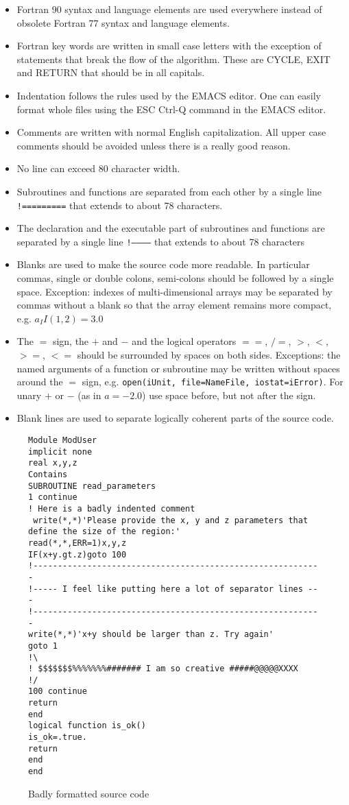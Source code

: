 \documentclass{article}
\begin{document}
\begin{itemize}
\item Fortran 90 syntax and language elements are used everywhere instead 
      of obsolete Fortran 77 syntax and language elements.
\item Fortran key words are written in small case letters with the 
      exception of statements that break the flow of the algorithm.
      These are CYCLE, EXIT and RETURN that should be in all capitals.
\item Indentation follows the rules used by the EMACS editor. One can
      easily format whole files using the ESC Ctrl-Q command in the
      EMACS editor.
\item Comments are written with normal English capitalization. All upper
      case comments should be avoided unless there is a really good reason.
\item No line can exceed 80 character width. 
\item Subroutines and functions are separated from each other 
      by a single line {\tt !=========} that extends to about 78 characters.
\item The declaration and the executable part of subroutines and functions
      are separated by a single line {\tt !------------} that extends to 
      about 78 characters
\item Blanks are used to make the source code more readable. In particular
      commas, single or double colons, semi-colons should be followed
      by a single space. Exception: indexes of multi-dimensional arrays
      may be separated by commas without a blank so that the array
      element remains more compact, e.g. $a_II(1,2) = 3.0$
\item The $=$ sign, the $+$ and $-$ and the logical operators
      $==$, $/=$, $>$, $<$, $>=$, $<=$ should be surrounded
      by spaces on both sides. Exceptions: the named arguments of a function
      or subroutine may be written without spaces around the $=$ sign, e.g.
      {\tt open(iUnit, file=NameFile, iostat=iError)}.
      For unary $+$ or $-$ (as in $a = -2.0$) use 
      space before, but not after the sign.
\item Blank lines are used to separate logically coherent parts of the 
      source code.
\end{itemize}

\begin{figure}
\begin{verbatim}
Module ModUser
implicit none
real x,y,z
Contains
SUBROUTINE read_parameters 
1 continue
! Here is a badly indented comment
 write(*,*)'Please provide the x, y and z parameters that define the size of the region:'
read(*,*,ERR=1)x,y,z
IF(x+y.gt.z)goto 100
!-----------------------------------------------------------
!----- I feel like putting here a lot of separator lines ---
!-----------------------------------------------------------
write(*,*)'x+y should be larger than z. Try again'
goto 1
!\
! $$$$$$$%%%%%%%####### I am so creative #####@@@@@XXXX
!/
100 continue
return
end
logical function is_ok()
is_ok=.true.
return
end
end
\end{verbatim}
\caption{Badly formatted source code}
\label{fig:badformat}
\end{figure}
\end{document}
